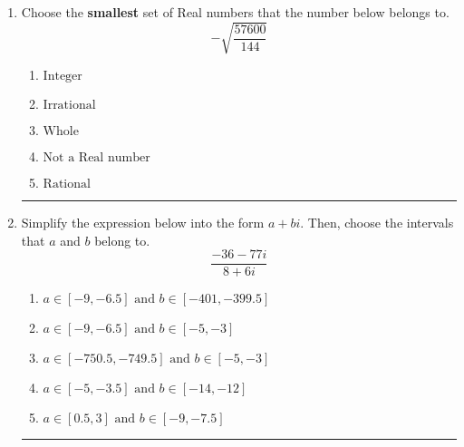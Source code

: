 \documentclass[14pt]{extbook}
\newcommand{\litem}[1]{\item#1\hspace*{-1cm}\rule{\textwidth}{0.4pt}}
\begin{document}
\begin{enumerate}
{\begin{enumerate}[label=\Alph*.]
\end{enumerate} }
\litem{
Choose the \textbf{smallest} set of Real numbers that the number below belongs to.\[ -\sqrt{\frac{57600}{144}} \]\begin{enumerate}[label=\Alph*.]
\item \( \text{Integer} \)
\item \( \text{Irrational} \)
\item \( \text{Whole} \)
\item \( \text{Not a Real number} \)
\item \( \text{Rational} \)

\end{enumerate} }
\litem{
Simplify the expression below into the form $a+bi$. Then, choose the intervals that $a$ and $b$ belong to.\[ \frac{-36 - 77 i}{8 + 6 i} \]\begin{enumerate}[label=\Alph*.]
\item \( a \in [-9, -6.5] \text{ and } b \in [-401, -399.5] \)
\item \( a \in [-9, -6.5] \text{ and } b \in [-5, -3] \)
\item \( a \in [-750.5, -749.5] \text{ and } b \in [-5, -3] \)
\item \( a \in [-5, -3.5] \text{ and } b \in [-14, -12] \)
\item \( a \in [0.5, 3] \text{ and } b \in [-9, -7.5] \)

\end{enumerate} }
\end{enumerate}
\end{document}
